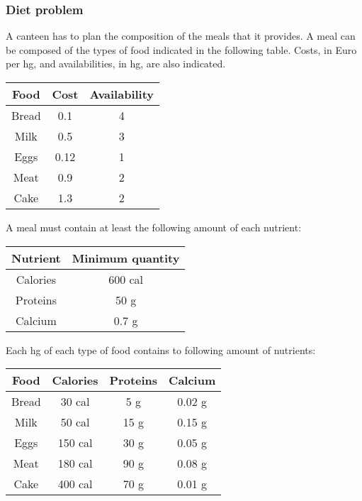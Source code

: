 \subsubsection{Diet problem}

A canteen has to plan the composition of the meals that it provides. A meal can be composed of the types of food indicated in the following table. Costs, in Euro per hg, and availabilities, in hg, are also indicated.

\begin{table}[!htp]
    \centering
    \begin{tabular}{@{} c c c @{}}
        \toprule
        \textbf{Food} & \textbf{Cost} & \textbf{Availability} \\
        \midrule
        Bread & 0.1 & 4 \\
        Milk & 0.5 & 3  \\
        Eggs & 0.12 & 1 \\
        Meat & 0.9 & 2  \\
        Cake & 1.3 & 2  \\
        \bottomrule
    \end{tabular}
\end{table}

\noindent
A meal must contain at least the following amount of each nutrient:

\begin{table}[!htp]
    \centering
    \begin{tabular}{@{} c c @{}}
        \toprule
        \textbf{Nutrient} & \textbf{Minimum quantity} \\
        \midrule
        Calories    & 600 cal   \\
        Proteins    & 50 g      \\
        Calcium     & 0.7 g     \\
        \bottomrule
    \end{tabular}
\end{table}

\noindent
Each hg of each type of food contains to following amount of nutrients:

\begin{table}[!htp]
    \centering
    \begin{tabular}{@{} c c c c @{}}
        \toprule
        \textbf{Food} & \textbf{Calories} & \textbf{Proteins} & \textbf{Calcium} \\
        \midrule
        Bread   & 30 cal    & 5 g   & 0.02 g \\
        Milk    & 50 cal    & 15 g  & 0.15 g \\
        Eggs    & 150 cal   & 30 g  & 0.05 g \\
        Meat    & 180 cal   & 90 g  & 0.08 g \\
        Cake    & 400 cal   & 70 g  & 0.01 g \\
        \bottomrule
    \end{tabular}
\end{table}

